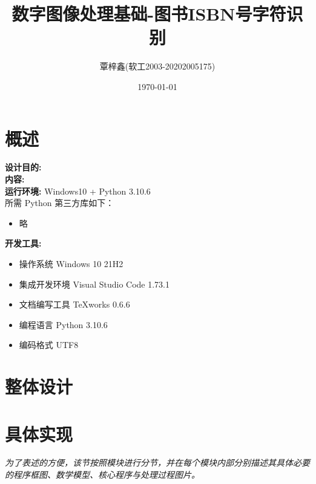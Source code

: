 \documentclass{ctexart}
\begin{document}
\title{数字图像处理基础-图书ISBN号字符识别}
\author{覃梓鑫(软工2003-20202005175)}
\date{\today}
\maketitle
\tableofcontents
\newpage
\section{概述}
\noindent
\textbf{设计目的:}\\
\textbf{内容:}\\
\textbf{运行环境:}
Windows10 + Python 3.10.6\\
所需 Python 第三方库如下：
\begin{itemize}
    \item 略
\end{itemize}
\noindent
\textbf{开发工具:}%
\begin{itemize}
    \item 操作系统 Windows 10 21H2
    \item 集成开发环境 Visual Studio Code 1.73.1
    \item 文档编写工具 TeXworks 0.6.6
    \item 编程语言 Python 3.10.6
    \item 编码格式 UTF8
\end{itemize}

\section{整体设计}
\section{具体实现}
\textit{为了表述的方便，该节按照模块进行分节，并在每个模块内部分别描述其具体必要的程序框图、数学模型、核心程序与处理过程图片。}
\end{document}
